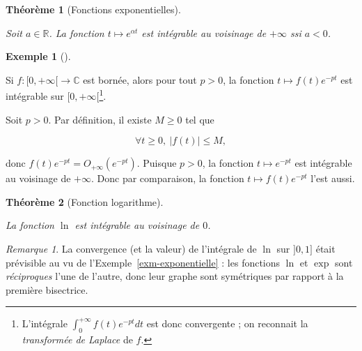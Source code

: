 \documentclass[
  french,
  letterpaper,
  DIV=11,
  numbers=noendperiod]{scrreprt}
\theoremstyle{plain}
\theoremstyle{definition}
\theoremstyle{plain}
\theoremstyle{plain}
\newtheorem{theorem}{Théorème}[chapter]
\theoremstyle{definition}
\theoremstyle{definition}
\newtheorem{example}{Exemple}[chapter]
\theoremstyle{plain}
\theoremstyle{remark}
\newtheorem{refremark}{Remarque}[chapter]
\begin{document}
\begin{theorem}[Fonctions
exponentielles]\protect\hypertarget{thm-exponentielle}{}\label{thm-exponentielle}

Soit \(a \in \mathbb{R}\). La fonction \(t \mapsto e^{\alpha t}\) est
intégrable au voisinage de \(+\infty\) ssi \(a<0\).

\end{theorem}

\begin{example}[]\protect\hypertarget{exm-bornee}{}\label{exm-bornee}

Si \(f:[0,+\infty[ \to \mathbb{C}\) est bornée, alors pour tout \(p>0\),
la fonction \(t \mapsto f(t)e^{-pt}\) est intégrable sur
\([0,+\infty[\)\footnote{L'intégrale \(\int_{0}^{+\infty}f(t)e^{-pt}dt\)
  est donc convergente ; on reconnait la \emph{transformée de Laplace}
  de \(f\).}.

Soit \(p>0\). Par définition, il existe \(M \geqslant 0\) tel que

\[
    \forall t \geqslant 0,\ |f(t)|\leqslant M,
\]

donc \(f(t)e^{-pt}=O_{+\infty}(e^{-pt})\). Puisque \(p>0\), la fonction
\(t \mapsto
e^{-pt}\) est intégrable au voisinage de \(+\infty\). Donc par
comparaison, la fonction \(t \mapsto f(t)e^{-pt}\) l'est aussi.

\end{example}

\begin{theorem}[Fonction
logarithme]\protect\hypertarget{thm-logarithme}{}\label{thm-logarithme}

La fonction \(\ln\) est intégrable au voisinage de \(0\).

\end{theorem}

\begin{refremark}
La convergence (et la valeur) de l'intégrale de \(\ln\) sur \(]0,1]\)
était prévisible au vu de l'Exemple~\ref{exm-exponentielle} : les
fonctions \(\ln\) et \(\exp\) sont \emph{réciproques} l'une de l'autre,
donc leur graphe sont symétriques par rapport à la première bisectrice.

\label{rem-fonction-réciproque}

\end{refremark}
\end{document}
